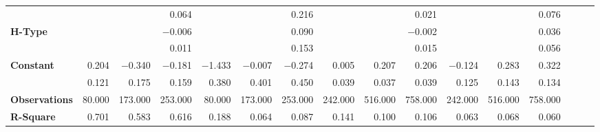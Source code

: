 \begin{tabular}{@{\extracolsep{5pt}}lrrrrrrrrrrrrrrr}
{\bf } & \phantom{***} & \phantom{***} & 0.064\phantom{\phantom{)}***} & \phantom{***} & \phantom{***} & 0.216\phantom{\phantom{)}***} & \phantom{***} & \phantom{***} & 0.021\phantom{\phantom{)}***} & \phantom{***} & \phantom{***} & 0.076\phantom{\phantom{)}***} \\
{\bf H-Type} & \phantom{***} & \phantom{***} & $-$0.006\phantom{\phantom{)}***} & \phantom{***} & \phantom{***} & 0.090\phantom{\phantom{)}***} & \phantom{***} & \phantom{***} & $-$0.002\phantom{\phantom{)}***} & \phantom{***} & \phantom{***} & 0.036\phantom{\phantom{)}***} \\
{\bf } & \phantom{***} & \phantom{***} & 0.011\phantom{\phantom{)}***} & \phantom{***} & \phantom{***} & 0.153\phantom{\phantom{)}***} & \phantom{***} & \phantom{***} & 0.015\phantom{\phantom{)}***} & \phantom{***} & \phantom{***} & 0.056\phantom{\phantom{)}***} \\
{\bf Constant} & 0.204\phantom{\phantom{)}***} & $-$0.340\phantom{\phantom{)}***} & $-$0.181\phantom{\phantom{)}***} & $-$1.433\phantom{\phantom{)}***} & $-$0.007\phantom{\phantom{)}***} & $-$0.274\phantom{\phantom{)}***} & 0.005\phantom{\phantom{)}***} & 0.207\phantom{\phantom{)}***} & 0.206\phantom{\phantom{)}***} & $-$0.124\phantom{\phantom{)}***} & 0.283\phantom{\phantom{)}***} & 0.322\phantom{\phantom{)}***} \\
{\bf } & 0.121\phantom{\phantom{)}***} & 0.175\phantom{\phantom{)}***} & 0.159\phantom{\phantom{)}***} & 0.380\phantom{\phantom{)}***} & 0.401\phantom{\phantom{)}***} & 0.450\phantom{\phantom{)}***} & 0.039\phantom{\phantom{)}***} & 0.037\phantom{\phantom{)}***} & 0.039\phantom{\phantom{)}***} & 0.125\phantom{\phantom{)}***} & 0.143\phantom{\phantom{)}***} & 0.134\phantom{\phantom{)}***} \\
{\bf Observations} & 80.000\phantom{\phantom{)}***} & 173.000\phantom{\phantom{)}***} & 253.000\phantom{\phantom{)}***} & 80.000\phantom{\phantom{)}***} & 173.000\phantom{\phantom{)}***} & 253.000\phantom{\phantom{)}***} & 242.000\phantom{\phantom{)}***} & 516.000\phantom{\phantom{)}***} & 758.000\phantom{\phantom{)}***} & 242.000\phantom{\phantom{)}***} & 516.000\phantom{\phantom{)}***} & 758.000\phantom{\phantom{)}***} \\
{\bf R-Square} & 0.701\phantom{***} & 0.583\phantom{***} & 0.616\phantom{***} & 0.188\phantom{***} & 0.064\phantom{***} & 0.087\phantom{***} & 0.141\phantom{***} & 0.100\phantom{***} & 0.106\phantom{***} & 0.063\phantom{***} & 0.068\phantom{***} & 0.060\phantom{***} \\
\hline
\end{tabular}
